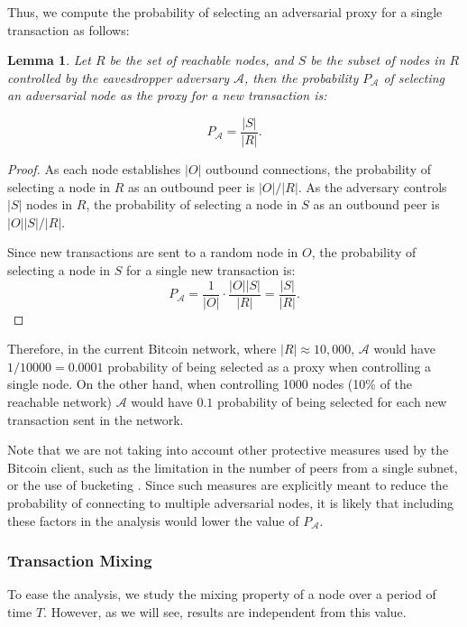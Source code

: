 \documentclass{article}
\newtheorem{lemm}{Lemma}
\begin{document}
	Thus, we compute the probability of selecting an adversarial proxy for a single transaction as follows: 
	\begin{lemm}
		\label{lem:advprox}
		Let $R$ be the set of reachable nodes, and $S$ be the subset of nodes in $R$ controlled by the eavesdropper adversary $\mathcal{A}$,
		then the probability $P_\mathcal{A}$ of selecting an adversarial node as the proxy for a new transaction is:
		
		\begin{equation}
			P_\mathcal{A} = \frac{|S|}{|R|}.
		\end{equation}
	\end{lemm}
	\begin{proof}
		As each node establishes $|O|$ outbound connections, the probability of selecting a node in $R$ as an outbound peer is $|O|/|R|$. 
		As the adversary controls $|S|$ nodes in $R$, the probability of selecting a node in $S$ as an outbound peer is $|O||S|/|R|$.
		
		Since new transactions are sent to a random node in $O$, the probability of selecting a node in $S$ for a single new transaction is:
		\begin{equation}
			P_\mathcal{A} = \frac{1}{|O|}{\cdot}\frac{|O||S|}{|R|} = \frac{|S|}{|R|}.
		\end{equation}
	\end{proof}
	
	Therefore, in the current Bitcoin network, where $|R|\approx 10,000$, $\mathcal{A}$ would have $1/10000=0.0001$ probability of being selected as a proxy when controlling a single node.
	On the other hand, when controlling 1000 nodes (10\% of the reachable network) $\mathcal{A}$ would have $0.1$ probability of being selected for each new transaction sent in the network.
	
	Note that we are not taking into account other protective measures used by the Bitcoin client, such as the limitation in the number of peers from a single subnet, or the use of bucketing \cite{bucketing}.
	Since such measures are explicitly meant to reduce the probability of connecting to multiple adversarial nodes, it is likely that including these factors in the analysis would lower the value of $P_\mathcal{A}$.
	
	\subsubsection{Transaction Mixing}
	To ease the analysis, we study the mixing property of a node over a period of time $T$.
	However, as we will see, results are independent from this value.
	
\end{document}
